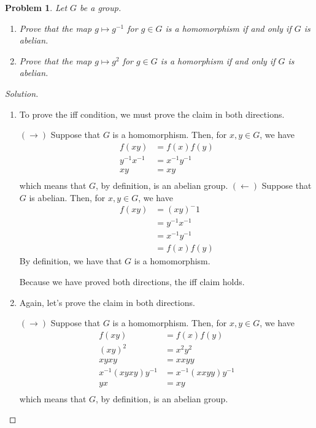 \documentclass[11 pt]{article}
\newtheorem{Prob}{Problem}
\theoremstyle{definition}
\theoremstyle{remark}
\newenvironment{solution}
  {\renewcommand\qedsymbol{$\blacksquare$}\begin{proof}[Solution]}
  {\end{proof}}
\begin{document}
\begin{Prob}
	Let $G$ be a group.
	\begin{enumerate}
		\item Prove that the map $g\mapsto g^{-1}$ for $g\in G$ is a homomorphism if and only if  $G$ is abelian.
		\item Prove that the map $g\mapsto g^{2}$ for $g\in G$ is a homorphism if and only if  $G$ is abelian.
	\end{enumerate}
\end{Prob}


\begin{solution}
\begin{enumerate}
    \item To prove the iff condition, we must prove the claim in both directions.

    $(\rightarrow)$ Suppose that $G$ is a homomorphism. Then, for $x,y \in G$, we have 
    \begin{align}
        f(xy) &= f(x)f(y) \\
        y^{-1}x^{-1} &= x^{-1}y^{-1} \\
        xy &= xy \\
    \end{align}
    which means that $G$, by definition, is an abelian group.
    $(\leftarrow)$ Suppose that $G$ is abelian. Then, for $x,y \in G$, we have
    \begin{align}
        f(xy) &= (xy)^-1 \\
              &= y^{-1}x^{-1} \\
              &= x^{-1}y^{-1} \\
              &= f(x)f(y)
    \end{align}
    By definition, we have that $G$ is a homomorphism.
    
    Because we have proved both directions, the iff claim holds.
    
    
    \item Again, let's prove the claim in both directions.

    $(\rightarrow)$ Suppose that $G$ is a homomorphism. Then, for $x,y \in G$, we have 
    \begin{align}
        f(xy) &= f(x)f(y) \\
        (xy)^2&= x^2y^2 \\
        xyxy  &= xxyy \\
        x^{-1}(xyxy)y^{-1} &= x^{-1}(xxyy)y^{-1} \\
        yx &= xy \\
    \end{align}
    which means that $G$, by definition, is an abelian group.
    

\end{enumerate}
\end{solution}
\end{document}
